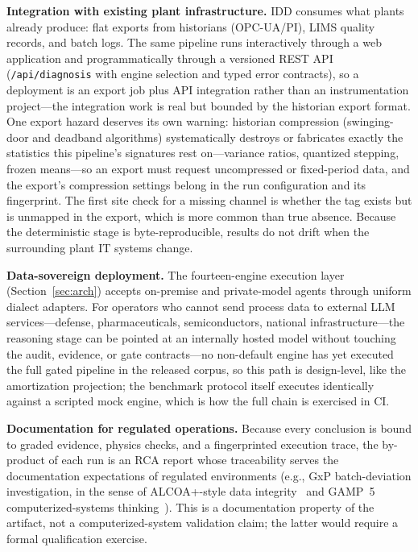 \documentclass[preprint,10pt]{elsarticle}
\begin{document}
\textbf{Integration with existing plant infrastructure.} IDD consumes what plants already produce: flat exports from historians (OPC-UA/PI), LIMS quality records, and batch logs. The same pipeline runs interactively through a web application and programmatically through a versioned REST API (\texttt{/api/diagnosis} with engine selection and typed error contracts), so a deployment is an export job plus API integration rather than an instrumentation project---the integration work is real but bounded by the historian export format. One export hazard deserves its own warning: historian compression (swinging-door and deadband algorithms) systematically destroys or fabricates exactly the statistics this pipeline's signatures rest on---variance ratios, quantized stepping, frozen means---so an export must request uncompressed or fixed-period data, and the export's compression settings belong in the run configuration and its fingerprint. The first site check for a missing channel is whether the tag exists but is unmapped in the export, which is more common than true absence. Because the deterministic stage is byte-reproducible, results do not drift when the surrounding plant IT systems change.

\textbf{Data-sovereign deployment.} The fourteen-engine execution layer (Section~\ref{sec:arch}) accepts on-premise and private-model agents through uniform dialect adapters. For operators who cannot send process data to external LLM services---defense, pharmaceuticals, semiconductors, national infrastructure---the reasoning stage can be pointed at an internally hosted model without touching the audit, evidence, or gate contracts---no non-default engine has yet executed the full gated pipeline in the released corpus, so this path is design-level, like the amortization projection; the benchmark protocol itself executes identically against a scripted mock engine, which is how the full chain is exercised in CI.

\textbf{Documentation for regulated operations.} Because every conclusion is bound to graded evidence, physics checks, and a fingerprinted execution trace, the by-product of each run is an RCA report whose traceability serves the documentation expectations of regulated environments (e.g., GxP batch-deviation investigation, in the sense of ALCOA+-style data integrity~\cite{mhra2018} and GAMP~5 computerized-systems thinking~\cite{gamp2022}). This is a documentation property of the artifact, not a computerized-system validation claim; the latter would require a formal qualification exercise.
\end{document}
